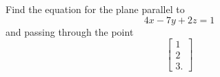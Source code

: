 Find the equation for the plane parallel to 
\[
4x-7y+2z=1
\]
and passing through the point
\[
\begin{bmatrix}
1 \\ 2 \\ 3.
\end{bmatrix}
\]

